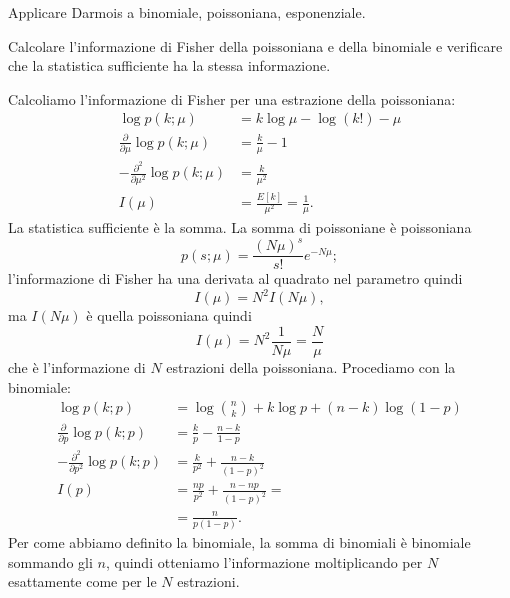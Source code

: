 \begin{exercise}
	Applicare Darmois a binomiale, poissoniana, esponenziale.
\end{exercise}

\begin{exercise}
	Calcolare l'informazione di Fisher della poissoniana e della binomiale e verificare che la statistica sufficiente ha la stessa informazione.
\end{exercise}

\begin{solution}
	Calcoliamo l'informazione di Fisher per una estrazione della poissoniana:
	\begin{align*}
		\log p(k;\mu)
		&= k\log\mu - \log(k!) - \mu \\
		\frac{\partial}{\partial\mu} \log p(k;\mu)
		&= \frac k\mu - 1 \\
		-\frac{\partial^2}{\partial\mu^2} \log p(k;\mu)
		&= \frac k{\mu^2} \\
		I(\mu)
		&= \frac{E[k]}{\mu^2}
		= \frac1\mu.
	\end{align*}
	La statistica sufficiente è la somma.
	La somma di poissoniane è poissoniana
	\begin{equation*}
		p(s;\mu)
		= \frac{(N\mu)^s}{s!}e^{-N\mu};
	\end{equation*}
	l'informazione di Fisher ha una derivata al quadrato nel parametro quindi
	\begin{equation*}
		I(\mu)
		= N^2 I(N\mu),
	\end{equation*}
	ma $I(N\mu)$ è quella poissoniana quindi
	\begin{equation*}
		I(\mu) = N^2 \frac1{N\mu} = \frac N\mu
	\end{equation*}
	che è l'informazione di $N$ estrazioni della poissoniana.
	Procediamo con la binomiale:
	\begin{align*}
		\log p(k;p)
		&= \log\binom nk + k\log p + (n-k)\log(1-p) \\
		\frac{\partial}{\partial p} \log p(k;p)
		&= \frac kp - \frac{n-k}{1-p} \\
		-\frac{\partial^2}{\partial p^2} \log p(k;p)
		&= \frac k{p^2} + \frac{n-k}{(1-p)^2} \\
		I(p)
		&= \frac{np}{p^2} + \frac{n-np}{(1-p)^2} = \\
		&= \frac n{p(1-p)}.
	\end{align*}
	Per come abbiamo definito la binomiale, la somma di binomiali è binomiale sommando gli $n$,
	quindi otteniamo l'informazione moltiplicando per $N$ esattamente come per le $N$ estrazioni.
\end{solution}

